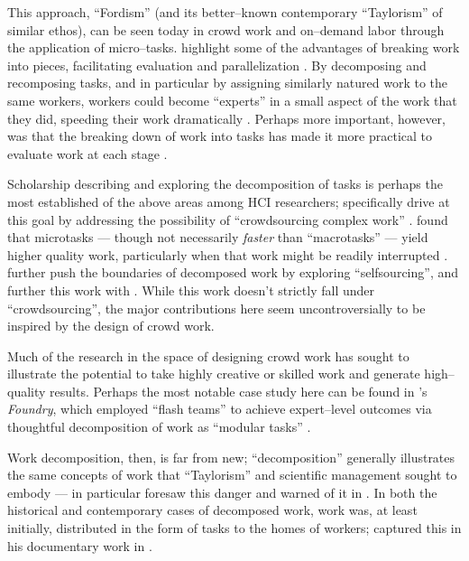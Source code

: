 \documentclass{sigchi}
\begin{document}
This approach, ``Fordism'' (and its better--known contemporary ``Taylorism'' of similar ethos),
can be seen today in crowd work and on--demand labor through the application of micro--tasks.
\citeauthor{writingMicroTasks} highlight some of the advantages of breaking work into pieces,
facilitating evaluation and parallelization
\cite{writingMicroTasks}.
By decomposing and recomposing tasks,
and in particular by assigning similarly natured work to the same workers,
workers could become ``experts'' in a small aspect of the work that they did,
speeding their work dramatically
\cite{delayAndOrderLasecki}.
Perhaps more important, however, was that
the breaking down of work into tasks has made it more practical to evaluate work at each stage
\cite{rogstadius2011assessment}.

Scholarship describing and exploring
the decomposition of tasks is perhaps the most established of the above areas among HCI researchers;
\citeauthor{crowdForgeKittur} specifically drive at this goal by addressing the possibility of
``crowdsourcing complex work''
\cite{crowdForgeKittur}.
\citeauthor{cheng2015break} found that microtasks
--- though not necessarily \textit{faster} than ``macrotasks'' ---
yield higher quality work,
particularly when that work might be readily interrupted
\cite{cheng2015break}.
\citeauthor{selfsourcingTeevan2014} further push the boundaries of decomposed work
by exploring ``selfsourcing'', and further this work with \citeauthor{selfsourcingTeevan2016}
\cite{selfsourcingTeevan2014,selfsourcingTeevan2016}.
While this work doesn't strictly fall under ``crowdsourcing'',
the major contributions here
seem uncontroversially to be inspired by the design of crowd work.

Much of the research in the space of designing crowd work has
sought to illustrate the potential to take highly creative or skilled work
and generate high--quality results.
Perhaps the most notable case study here can be found in
\citeauthor{foundry}'s \textit{Foundry}, which employed
``flash teams'' to achieve expert--level outcomes via thoughtful
decomposition of work as ``modular tasks''
\cite{foundry}.

Work decomposition, then, is far from new;
``decomposition'' generally illustrates the same concepts of work that ``Taylorism''
and scientific management sought to embody
---
\citeauthor{silberman2010ethics} in particular foresaw this danger and warned of it in
\citeyear{silberman2010ethics}
\cite{crowdworkFuture,silberman2010ethics,nickerson2013crowd}.
In both the historical and contemporary cases of decomposed work,
work was,
at least initially,
distributed in the form of tasks to the homes of workers;
\citeauthor{riisOtherSideLives} captured this in his documentary work
in \citeyear{riisOtherSideLives}
\cite{riisOtherSideLives}.
\end{document}
